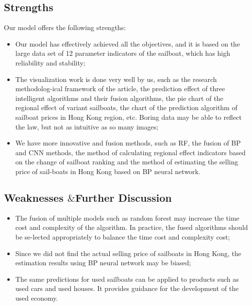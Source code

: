 \subsection{Strengths}
Our model offers the following strengths: 
\begin{itemize}
    \setlength{\parsep}{0ex} %
    \setlength{\topsep}{2ex} %
    \setlength{\itemsep}{1ex} %
    \item Our model has effectively achieved all the objectives, and it is based on the large data set of 12 parameter indicators of the sailboat, which has high reliability and stability;
    \item The visualization work is done very well by us, such as the research methodolog-ical framework of the article, the prediction effect of three intelligent algorithms and their fusion algorithms, the pie chart of the regional effect of variant sailboats, the chart of the prediction algorithm of sailboat prices in Hong Kong region, etc. Boring data may be able to reflect the law, but not as intuitive as so many images;
    \item We have more innovative and fusion methods, such as RF, the fusion of BP and CNN methods, the method of calculating regional effect indicators based on the change of sailboat ranking and the method of estimating the selling price of sail-boats in Hong Kong based on BP neural network.
\end{itemize}
\subsection{Weaknesses \texorpdfstring{$\&$} FFurther Discussion}
\begin{itemize}
    \setlength{\parsep}{0ex} %
    \setlength{\topsep}{2ex} %
    \setlength{\itemsep}{1ex} %
    \item The fusion of multiple models such as random forest may increase the time cost and complexity of the algorithm. In practice, the fused algorithms should be se-lected appropriately to balance the time cost and complexity cost;
    \item Since we did not find the actual selling price of sailboats in Hong Kong, the estimation results using BP neural network may be biased;
    \item The same predictions for used sailboats can be applied to products such as used cars and used houses. It provides guidance for the development of the used economy.
\end{itemize}

